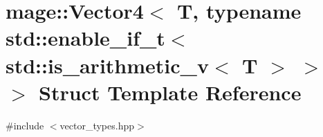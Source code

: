 \hypertarget{structmage_1_1_vector4_3_01_t_00_01typename_01std_1_1enable__if__t_3_01std_1_1is__arithmetic__v_3_01_t_01_4_01_4_01_4}{}\section{mage\+:\+:Vector4$<$ T, typename std\+:\+:enable\+\_\+if\+\_\+t$<$ std\+:\+:is\+\_\+arithmetic\+\_\+v$<$ T $>$ $>$ $>$ Struct Template Reference}
\label{structmage_1_1_vector4_3_01_t_00_01typename_01std_1_1enable__if__t_3_01std_1_1is__arithmetic__v_3_01_t_01_4_01_4_01_4}


{\ttfamily \#include $<$vector\+\_\+types.\+hpp$>$}


